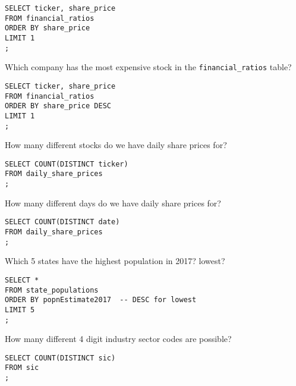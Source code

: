 \documentclass[10pt]{exam}
\begin{document}
\begin{questions}
\begin{solution}
\begin{lstlisting}
SELECT ticker, share_price
FROM financial_ratios
ORDER BY share_price
LIMIT 1
;
\end{lstlisting}
\end{solution}

    \question Which company has the most expensive stock in the
    \texttt{financial\_ratios} table?

\begin{solution}
\begin{lstlisting}
SELECT ticker, share_price
FROM financial_ratios
ORDER BY share_price DESC
LIMIT 1
;
\end{lstlisting}
\end{solution}


\question How many different stocks do we have daily share prices for?

\begin{solution}
\begin{lstlisting}
SELECT COUNT(DISTINCT ticker)
FROM daily_share_prices
;
\end{lstlisting}
\end{solution}


\question How many different days do we have daily share prices for?

\begin{solution}
\begin{lstlisting}
SELECT COUNT(DISTINCT date)
FROM daily_share_prices
;
\end{lstlisting}
\end{solution}


\question Which 5 states have the highest population in 2017? lowest?

\begin{solution}
\begin{lstlisting}
SELECT *
FROM state_populations
ORDER BY popnEstimate2017  -- DESC for lowest
LIMIT 5
;
\end{lstlisting}
\end{solution}


\question How many different 4 digit industry sector codes are possible?

\begin{solution}
\begin{lstlisting}
SELECT COUNT(DISTINCT sic)
FROM sic
;
\end{lstlisting}
\end{solution}



\end{questions}
\end{document}
